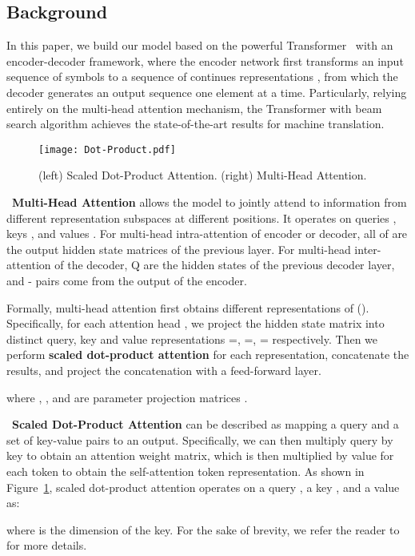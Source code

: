 \documentclass[11pt,a4paper]{article}
\begin{document}
\begin{CJK*}{UTF8}{gbsn}
\section{Background}

In this paper, we build our model based on the powerful Transformer~\cite{vaswani2017attention} with an encoder-decoder framework, where the encoder network first transforms an input sequence of symbols  to a sequence of continues representations , from which the decoder generates an output sequence  one element at a time.
Particularly, relying entirely on the multi-head attention mechanism, the Transformer with beam search algorithm achieves the state-of-the-art results for machine translation.

\begin{figure}
    \centering
    \texttt{[image: Dot-Product.pdf]}
    \caption{(left) Scaled Dot-Product Attention. (right) Multi-Head Attention.
    }\label{Dot-Procdut}
\end{figure}

~\textbf{Multi-Head Attention} allows the model to jointly attend to information from different representation subspaces at different positions.
It operates on queries , keys , and values .
For multi-head intra-attention of encoder or decoder, all of  are the output hidden state matrices of the previous layer. For multi-head inter-attention of the decoder, Q are the hidden states of the previous decoder layer, and - pairs come from the output  of the encoder.

Formally, multi-head attention first obtains  different representations of (). Specifically, for each attention head , we project the hidden state matrix into distinct query, key and value representations =, =,  = respectively.
Then we perform {\bf scaled dot-product attention} for each representation, concatenate the results, and project the concatenation
with a feed-forward layer.  


where , ,  and  are parameter projection matrices .

~\textbf{Scaled Dot-Product Attention} can be described as mapping a query and a set of key-value pairs to an output. 
Specifically, we can then multiply query  by key  to obtain an attention weight matrix, which is then multiplied by value  for each token to obtain the self-attention token representation.
As shown in Figure~\ref{Dot-Procdut}, scaled dot-product attention operates on a query , a key , and a value  as:

where  is the dimension of the key. For the sake of brevity, we refer the reader to  for more details.


\end{CJK*}
\end{document}
